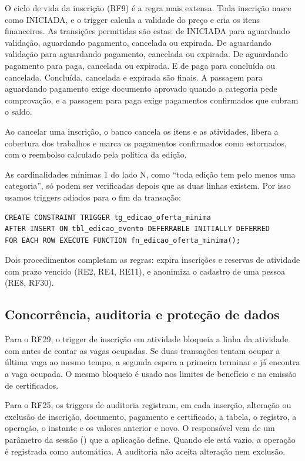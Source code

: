 O ciclo de vida da inscrição (RF9) é a regra mais extensa. Toda inscrição nasce como INICIADA, e o trigger calcula a validade do preço e cria os itens financeiros. As transições permitidas são estas: de INICIADA para aguardando validação, aguardando pagamento, cancelada ou expirada. De aguardando validação para aguardando pagamento, cancelada ou expirada. De aguardando pagamento para paga, cancelada ou expirada. E de paga para concluída ou cancelada. Concluída, cancelada e expirada são finais. A passagem para aguardando pagamento exige documento aprovado quando a categoria pede comprovação, e a passagem para paga exige pagamentos confirmados que cubram o saldo.

Ao cancelar uma inscrição, o banco cancela os itens e as atividades, libera a cobertura dos trabalhos e marca os pagamentos confirmados como estornados, com o reembolso calculado pela política da edição.

As cardinalidades mínimas 1 do lado N, como ``toda edição tem pelo menos uma categoria'', só podem ser verificadas depois que as duas linhas existem. Por isso usamos triggers adiados para o fim da transação:

\begin{lstlisting}
CREATE CONSTRAINT TRIGGER tg_edicao_oferta_minima
AFTER INSERT ON tbl_edicao_evento DEFERRABLE INITIALLY DEFERRED
FOR EACH ROW EXECUTE FUNCTION fn_edicao_oferta_minima();
\end{lstlisting}

Dois procedimentos completam as regras:  expira inscrições e reservas de atividade com prazo vencido (RE2, RE4, RE11), e  anonimiza o cadastro de uma pessoa (RE8, RF30).

\subsection{Concorrência, auditoria e proteção de dados}

Para o RF29, o trigger de inscrição em atividade bloqueia a linha da atividade com  antes de contar as vagas ocupadas. Se duas transações tentam ocupar a última vaga ao mesmo tempo, a segunda espera a primeira terminar e já encontra a vaga ocupada. O mesmo bloqueio é usado nos limites de benefício e na emissão de certificados.

Para o RF25, os triggers de auditoria registram, em cada inserção, alteração ou exclusão de inscrição, documento, pagamento e certificado, a tabela, o registro, a operação, o instante e os valores anterior e novo. O responsável vem de um parâmetro da sessão () que a aplicação define. Quando ele está vazio, a operação é registrada como automática. A auditoria não aceita alteração nem exclusão.

